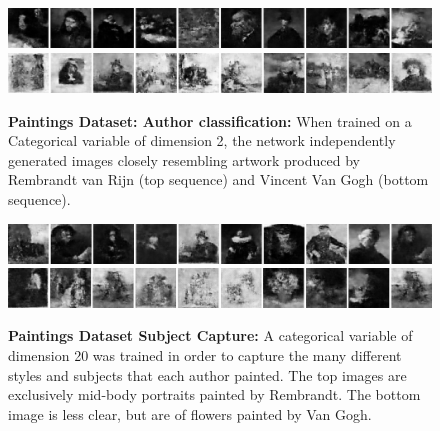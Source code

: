 \documentclass[conference,11pt]{IEEEtran}
\begin{document}
\begin{table}[h]
\centering
\caption{Hyperparameters for Personal Dataset}
\end{table}


\begin{figure}[ht]
    \centering
    \includegraphics[width=7.25in]{pictures/Datasets/art/betterRembrandt_dim2.jpg}\vspace*{2mm}
    \hspace*{.15mm}\includegraphics[width=7.25in]{pictures/Datasets/art/betterVanGogh_dim2.jpg}
    \caption{\textbf{Paintings Dataset: Author classification:} When trained on a Categorical variable of dimension 2, the network independently generated images closely resembling artwork produced by Rembrandt van Rijn (top sequence) and Vincent Van Gogh (bottom sequence).}
\end{figure}

\begin{figure}[ht]
    \centering
    \includegraphics[width=7.25in]{pictures/Datasets/art/great_rembrandt_portraits.jpg}\vspace*{2mm}
    \hspace*{.15mm}\includegraphics[width=7.25in]{pictures/Datasets/art/VanGogh_flowers.jpg}
    \caption{\textbf{Paintings Dataset Subject Capture:} A categorical variable of dimension 20 was trained in order to capture the many different styles and subjects that each author painted.  The top images are exclusively mid-body portraits painted by Rembrandt.  The bottom image is less clear, but are of flowers painted by Van Gogh.}
\end{figure}
\end{document}
